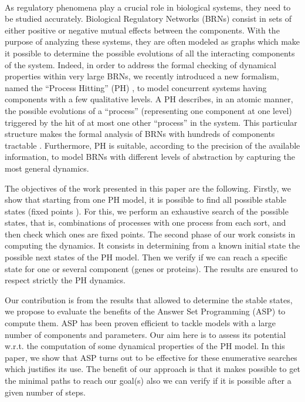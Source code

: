  \\
As regulatory phenomena play a crucial role in biological systems, they need to
be studied accurately. Biological Regulatory Networks (BRNs) consist in sets
of either positive or negative mutual effects between the components. With the
purpose of analyzing these systems, they are often modeled as graphs which make
it possible to determine the possible evolutions of all the interacting components of the system. Indeed, in order to address the formal checking of dynamical properties within very large BRNs, we recently introduced a new formalism, named the “Process Hitting” (PH) \cite{PMR10-TCSB}, to model concurrent systems having components with a few qualitative levels. A PH describes, in an atomic manner, the possible evolutions of a “process” (representing one component at one level) triggered by the hit of at most one other “process” in the system. This particular structure makes the formal analysis of BRNs with hundreds of components tractable . Furthermore, PH is suitable, according to the precision of the available information, to model BRNs with different levels of abstraction by capturing the most general dynamics.

The objectives of the work presented in this paper are the following.
Firstly, we show that starting from one PH model, it is possible to find all possible stable states (fixed points \cite{wuensche1998genomic} ).
For this, we perform an exhaustive search of the possible states, that is, combinations of processes with one process from each sort, and then check which ones are fixed points.
The second phase of our work consists in computing the dynamics. It consists in determining from a known initial state the possible next states of the PH model. Then we verify if we can reach a specific state for one or several component (genes or proteins). The results are ensured to respect strictly the PH dynamics.

Our contribution is from the results that allowed to determine the stable states, we propose to evaluate the benefits of the Answer Set Programming (ASP) \cite{baral2003knowledge} to compute them. ASP has been proven efficient to tackle models with a large number of components and parameters. Our aim here is to assess its potential w.r.t. the computation of some dynamical properties of the PH model. In this paper, we show that ASP turns out to be effective for these enumerative searches which justifies its use. The benefit of our approach is that it makes possible to get the minimal paths to reach our goal(s) also we can verify if it is possible after a given number of steps. %

